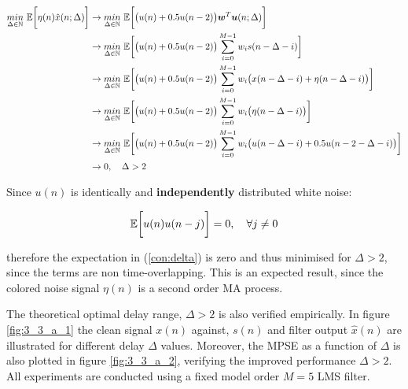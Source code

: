 \begin{enumerate}[label=\alph*), leftmargin=*]
\begin{align}
    \underset{\Delta \in {\mathbb{N}}}{min}\ {\mathbb{E}} \bigg[ \eta(n) \hat{x}(n; \Delta) \bigg] &\rightarrow
        \underset{\Delta \in {\mathbb{N}}}{min}\ {\mathbb{E}} \bigg[ \big( u(n) + 0.5u(n-2) \big) {\bm{w}}^{T} {\bm{u}}(n; \Delta) \bigg] \\
                                                                                &\rightarrow
        \underset{\Delta \in {\mathbb{N}}}{min}\ {\mathbb{E}} \bigg[ \big( u(n) + 0.5u(n-2) \big) \sum_{i=0}^{M-1} w_{i} s(n - \Delta - i) \bigg] \\
                                                                                &\rightarrow
        \underset{\Delta \in {\mathbb{N}}}{min}\ {\mathbb{E}} \bigg[ \big( u(n) + 0.5u(n-2) \big) \sum_{i=0}^{M-1} w_{i} \big( x(n - \Delta - i) + \eta(n - \Delta - i) \big) \bigg] \\
                                                                                &\rightarrow
        \underset{\Delta \in {\mathbb{N}}}{min}\ {\mathbb{E}} \bigg[ \big( u(n) + 0.5u(n-2) \big) \sum_{i=0}^{M-1} w_{i} \big( \eta(n - \Delta - i) \big) \bigg] \\
                                                                                &\rightarrow
        \underset{\Delta \in {\mathbb{N}}}{min}\ {\mathbb{E}} \bigg[ \big( u(n) + 0.5u(n-2) \big) \sum_{i=0}^{M-1} w_{i} \big( u(n - \Delta - i) + 0.5 u(n - 2 - \Delta - i) \big) \bigg]
\label{con:delta} \\
                                                                                &\rightarrow
        0, \quad \Delta > 2
\end{align}

Since $u(n)$ is identically and \textbf{independently} distributed white noise:

\begin{equation}
    {\mathbb{E}} \bigg[ u(n) u(n - j) \bigg] = 0, \quad \forall j \neq 0
\end{equation}

therefore the expectation in (\ref{con:delta}) is zero and thus minimised for $\Delta > 2$, since the terms are non time-overlapping.
This is an expected result, since the colored noise signal $\eta(n)$ is a second order MA process.

The theoretical optimal delay range, $\Delta > 2$ is also verified empirically. In figure \ref{fig:3_3_a_1} the clean signal $x(n)$ against, $s(n)$ and filter output $\hat{x}(n)$
are illustrated for different delay $\Delta$ values. Moreover, the MPSE as a function of $\Delta$ is also plotted in figure \ref{fig:3_3_a_2}, verifying the improved performance $\Delta > 2$.
All experiments are conducted using a fixed model order $M = 5$ LMS filter.


\end{enumerate}

